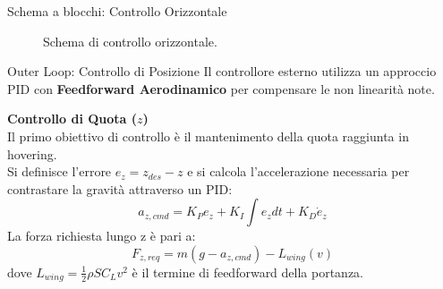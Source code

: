 \documentclass[aspectratio=169]{beamer} %
\begin{document}
\begin{frame}{Schema a blocchi: Controllo Orizzontale}
\begin{figure}[htbp]
{
    }
\caption{Schema di controllo orizzontale.}
\label{fig:control_scheme}
\end{figure}
\end{frame}

\begin{frame}{Outer Loop: Controllo di Posizione}
    Il controllore esterno utilizza un approccio PID con \textbf{Feedforward Aerodinamico} per compensare le non linearità note.
    
    \vspace{0.2cm}
    \textbf{Controllo di Quota ($z$)} \\
    Il primo obiettivo di controllo è il mantenimento della quota raggiunta in hovering.\\
    Si definisce l'errore $e_z = z_{des} - z$ e si calcola l'accelerazione necessaria per contrastare la gravità attraverso un PID:
    \begin{equation}
        a_{z,cmd} = K_P e_z + K_I \int e_z dt + K_D \dot{e}_z
    \end{equation} 
    La forza richiesta lungo z è pari a:
    \begin{equation}
        F_{z,req} = m (g - a_{z,cmd}) - L_{wing}(v)
        \label{eq:fz}
    \end{equation}
    dove $L_{wing} = \frac{1}{2}\rho S C_L v^2$ è il termine di feedforward della portanza.\\
\end{frame}

        
\end{document}
